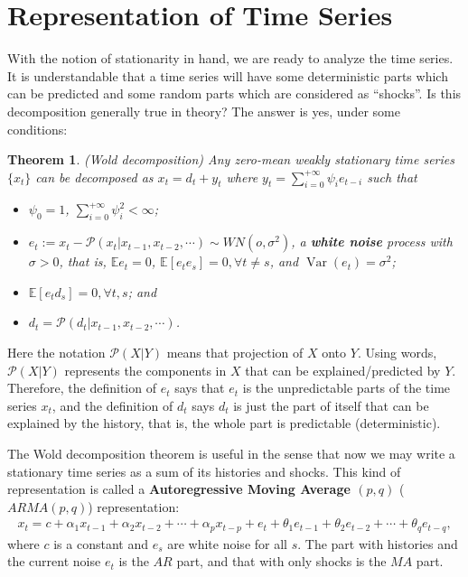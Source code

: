 \documentclass[12pt]{article}
\newtheorem{theorem}{Theorem}
\begin{document}
\section{Representation of Time Series}
With the notion of stationarity in hand, we are ready to analyze the time series. It is understandable that a time series will have some deterministic parts which can be predicted and some random parts which are considered as ``shocks''. Is this decomposition generally true in theory? The answer is yes, under some conditions:
\begin{theorem}(Wold decomposition)
    Any zero-mean weakly stationary time series $\{x_t\}$ can be decomposed as $x_t = d_t + y_t$ where $y_t = \sum_{i=0}^{+\infty} \psi_i e_{t-i}$ such that
    \begin{itemize}
        \item $\psi_0 = 1$, $\sum_{i=0}^{+\infty} \psi_i^2 < \infty$;
        \item $e_t := x_t - \mathcal{P}(x_t | x_{t-1}, x_{t-2}, \cdots) \sim WN(o, \sigma^2)$, a \textbf{white noise} process with $\sigma > 0$, that is, $\mathbb{E} e_t = 0$, $\mathbb{E} [e_t e_s] = 0, \forall t\neq s$, and $\operatorname{Var}(e_t) = \sigma^2$;
        \item $\mathbb{E}[e_t d_s] = 0, \forall t, s$; and
        \item $d_t = \mathcal{P}(d_t | x_{t-1}, x_{t-2}, \cdots)$.
    \end{itemize}
\end{theorem}
Here the notation $\mathcal{P}(X|Y)$ means that projection of $X$ onto $Y$. Using words, $\mathcal{P}(X|Y)$ represents the components in $X$ that can be explained/predicted by $Y$. Therefore, the definition of $e_t$ says that $e_t$ is the unpredictable parts of the time series $x_t$, and the definition of $d_t$ says $d_t$ is just the part of itself that can be explained by the history, that is, the whole part is predictable (deterministic).

The Wold decomposition theorem is useful in the sense that now we may write a stationary time series as a sum of its histories and shocks. This kind of representation is called a \textbf{Autoregressive Moving Average $(p,q)$} ($ARMA(p,q)$) representation:
\begin{align*}
    x_t = c + \alpha_1 x_{t-1} + \alpha_2 x_{t-2} + \cdots + \alpha_p x_{t-p} + e_t + \theta_1 e_{t-1} + \theta_2 e_{t-2} + \cdots + \theta_q e_{t-q},
\end{align*}
where $c$ is a constant and $e_s$ are white noise for all $s$. The part with histories and the current noise $e_t$ is the $AR$ part, and that with only shocks is the $MA$ part. 
\end{document}
